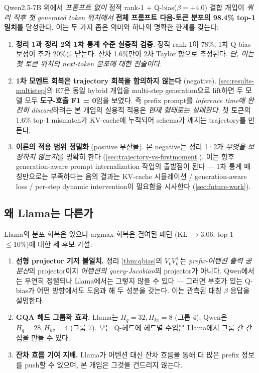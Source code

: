 \documentclass{article}
\theoremstyle{definition}
\newcommand{\Hq}{H_q}
\newcommand{\Hkv}{H_{kv}}
\begin{document}
Qwen2.5-7B 위에서 \emph{프롬프트 없이} 정적 rank-1 + Q-bias($\beta{=}{+}4.0$) 결합 개입이 \emph{쿼리 직후 첫 generated token 위치에서} \textbf{전체 프롬프트 다음-토큰 분포의 98.4\% top-1 일치}를 달성한다. 이는 두 가지 좁은 의미와 하나의 명확한 한계를 갖는다:
\begin{enumerate}[leftmargin=*]
\item \textbf{정리 1과 정리 2의 1차 통계 수준 실증적 검증}. 정적 rank-1이 78\%, 1차 Q-bias 보정이 추가 20\%를 닫는다. 잔차 1.6\%만이 2차 Taylor 항으로 추정된다. \emph{단, 이는 첫 토큰 위치의 next-token 분포에 대한 진술이다.}
\item \textbf{1차 모멘트 회복은 trajectory 회복을 함의하지 않는다} (negative). \cref{sec:results-multistep}의 E7은 동일 hybrid 개입을 multi-step generation으로 lift하면 두 모델 모두 \textbf{도구-호출 F1 = 0}임을 보였다. 즉 prefix prompt를 \emph{inference time에 완전히 discard}하려는 본 개입의 실용적 적용은 \emph{현재 형태로는 실패한다}. 첫 토큰의 1.6\% top-1 mismatch가 KV-cache에 누적되어 schema가 깨지는 trajectory를 만든다.
\item \textbf{이론의 적용 범위 정밀화} (positive 부산물). 본 negative는 정리 1·2가 \emph{무엇을 보장하지 않는지}를 명확히 한다 (\cref{sec:trajectory-vs-firstmoment}). 이는 향후 generation-aware prompt internalization 작업의 출발점이 된다 — 1차 통계 매칭만으로는 부족하다는 음의 결과는 KV-cache 시뮬레이션 / generation-aware loss / per-step dynamic intervention이 필요함을 시사한다 (\cref{sec:future-work}).
\end{enumerate}

\subsection{왜 Llama는 다른가}
\label{sec:llama-diff}

Llama의 분포 회복은 있으나 argmax 회복은 결여된 패턴 (KL $\to 3.06$, top-1 $\le 10\%$)에 대한 세 후보 가설:
\begin{enumerate}[leftmargin=*]
\item \textbf{선형 projector 기저 불일치.} 정리 \ref{thm:qbias}의 $V_k V_k^\top$는 \emph{prefix-어텐션 출력 공분산}의 projector이지 \emph{어텐션의 query-Jacobian}의 projector가 아니다. Qwen에서는 우연히 정렬되나 Llama에서는 그렇지 않을 수 있다 --- 그러면 부호가 있는 Q-bias가 어떤 방향에서도 도움과 해 두 성분을 갖는다. 이는 관측된 대칭 $\beta$ 응답을 설명한다.
\item \textbf{GQA 헤드 그룹화 효과.} Llama는 $\Hq{=}32, \Hkv{=}8$ (그룹 4); Qwen은 $\Hq{=}28, \Hkv{=}4$ (그룹 7). 모든 Q-헤드에 헤드별 주입은 Llama에서 그룹 간 간섭을 만들 수 있다.
\item \textbf{잔차 흐름 기여 지배.} Llama가 어텐션 대신 잔차 흐름을 통해 더 많은 prefix 정보를 push할 수 있으며, 본 개입은 그것을 건드리지 않는다.
\end{enumerate}
\end{document}
